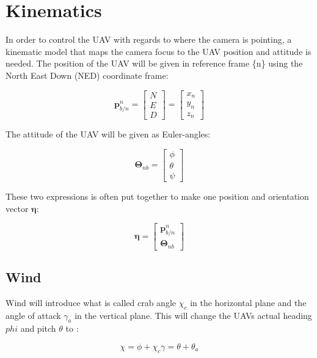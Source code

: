 \section{Kinematics}
In order to control the UAV with regards to where the camera is pointing, a kinematic model that maps the camera focus to the UAV position and attitude is needed. The position of the UAV will be given in reference frame \{n\} using the North East Down (NED) coordinate frame:

\begin{equation}
	\bm{p}_{b/n}^n =
	\begin{bmatrix}
		N \\ E \\ D
	\end{bmatrix}
	=
	\begin{bmatrix}
		x_n \\ y_n \\ z_n
	\end{bmatrix}
\end{equation}

The attitude of the UAV will be given as Euler-angles:

\begin{equation}
	\bm{\Theta}_{nb} = 
	\begin{bmatrix}
		\phi \\ \theta \\ \psi
	\end{bmatrix}
\end{equation}
	
These two expressions is often put together to make one position and orientation vector $\bm{\eta}$:

\begin{equation}
	\bm{\eta} =
	\begin{bmatrix}
		\bm{p}_{b/n}^n \\
		\bm{\Theta}_{nb}
	\end{bmatrix}
\end{equation}
	
\subsection{Wind}
Wind will introduce what is called crab angle $\chi_c$ in the horizontal plane and the angle of attack $\gamma_a$ in the vertical plane. This will change the UAVs actual heading $phi$ and pitch $\theta$ to \cite{suaBEARD}:

\begin{subequations}
\begin{equation}
	\chi = \phi + \chi_c
\end{equation}
\begin{equation}
	\gamma = \theta + \theta_a
\end{equation}
\end{subequations}

